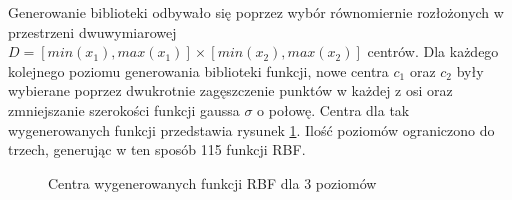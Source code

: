 Generowanie biblioteki odbywało się poprzez wybór równomiernie rozłożonych w przestrzeni dwuwymiarowej $D = [min(x_1),max(x_1)] \times [min(x_2),max(x_2)]$ centrów. Dla każdego kolejnego poziomu generowania biblioteki funkcji, nowe centra $c_1$ oraz $c_2$ były wybierane poprzez dwukrotnie zagęszczenie punktów w każdej z osi oraz zmniejszanie szerokości funkcji gaussa $\sigma$ o połowę. Centra dla tak wygenerowanych funkcji przedstawia rysunek \ref{img:rbf_centers}. Ilość poziomów ograniczono do trzech, generując w ten sposób 115 funkcji RBF.

\begin{figure}[ht!]
	\centering	
	

	\caption{Centra wygenerowanych funkcji RBF dla 3 poziomów}
	\label{img:rbf_centers}
\end{figure}

